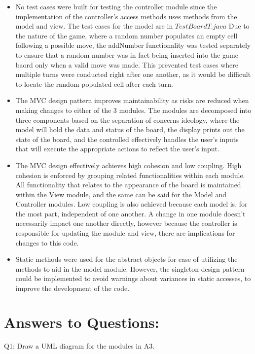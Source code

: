 \documentclass[12pt]{article}
\begin{document}
\begin{itemize}
  \item No test cases were built for testing the controller module since the implementation of the controller's access methods uses methods from the model and view. The test cases for the model are in $TestBoardT.java$ Due to the nature of the game, where a random number populates an empty cell following a possible move, the addNumber functionality was tested separately to ensure that a random number was in fact being inserted into the game baord only when a valid move was made. This prevented test cases where multiple turns were conducted right after one another, as it would be difficult to locate the random populated cell after each turn.
\item The MVC design pattern improves maintainability as risks are reduced when making changes to either of the 3 modules. The modules are decomposed into three components based on the separation of concerns ideology, where the model will hold the data and status of the board, the display prints out the state of the board, and the controlled effectively handles the user's inputs that will execute the appropriate actions to reflect the user's input. 
\item The MVC design effectively achieves high cohesion and low coupling. High cohesion is enforced by grouping related functionalities within each module. All functionality that relates to the appearance of the board is maintained within the View module, and the same can be said for the Model and Controller modules. Low coupling is also achieved because each model is, for the most part, independent of one another. A change in one module doesn't necessarily impact one another directly, however because the controller is responsible for updating the module and view, there are implications for changes to this code. 
  \item Static methods were used for the abstract objects for ease of utilizing the methods to aid in the model module. However, the singleton design pattern could be implemented to avoid warnings about variances in static accesses, to improve the development of the code. 
  
\end{itemize}

\newpage
\section*{Answers to Questions:}

Q1: Draw a UML diagram for the modules in A3.
\end{document}
